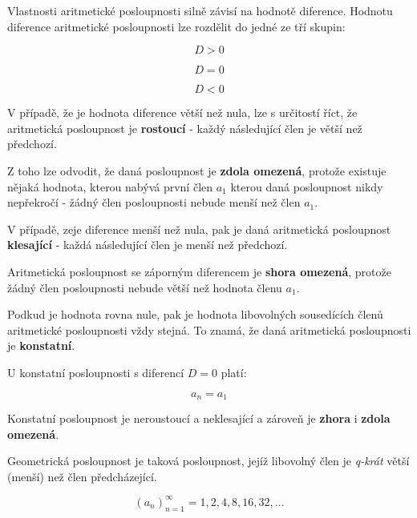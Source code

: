 Vlastnosti aritmetické posloupnosti silně závisí na hodnotě diference. Hodnotu diference aritmetické posloupnosti lze rozdělit do jedné ze tří skupin:

$$ D > 0 $$

$$ D = 0 $$

$$ D < 0 $$


V případě, že je hodnota diference větší než nula, lze s určitostí říct, že aritmetická posloupnost je {\bf rostoucí} - každý následující člen je větší než předchozí.

\vskip 4mm
\centerline{}
\vskip 4mm

Z toho lze odvodit, že daná posloupnost je {\bf zdola omezená}, protože existuje nějaká hodnota, kterou nabývá první člen $a_1$ kterou daná posloupnost nikdy nepřekročí - žádný člen posloupnosti nebude menší než člen $a_1$.


V případě, zeje diference menší než nula, pak je daná aritmetická posloupnost {\bf klesající} - každá následující člen je menší než předchozí.

\vskip 4mm
\centerline{}
\vskip 4mm

Aritmetická posloupnost se záporným diferencem je {\bf shora omezená}, protože žádný člen posloupnosti nebude větší než hodnota členu $a_1$.


Podkud je hodnota rovna nule, pak je hodnota libovolných sousedících členů aritmetické posloupnosti vždy stejná. To znamá, že daná aritmetická posloupnosti je {\bf konstatní}.

\vskip 4mm
\centerline{}
\vskip 4mm

U konstatní posloupnosti s diferencí $ D = 0$ platí:

$$ a_n = a_1 $$

Konstatní posloupnost je neroustoucí a neklesající a zároveň je {\bf zhora} i {\bf zdola omezená}.


Geometrická posloupnost je taková posloupnost, jejíž libovolný člen je {\it q-krát} větší (menší) než člen předcházející.

$$ (a_n)_{n=1}^{\infty} = 1, 2, 4, 8, 16, 32, ...  $$

